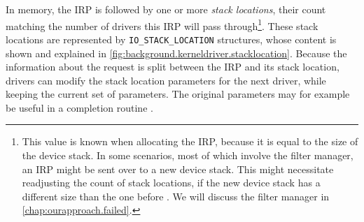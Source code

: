 In memory, the IRP is followed by one or more \emph{stack locations}, their count matching the number of drivers this IRP will pass through\footnote{\label{fn:background.kerneldriver.adjuststacksize} This value is known when allocating the IRP, because it is equal to the size of the device stack. In some scenarios, most of which involve the filter manager, an IRP might be sent over to a new device stack. This might necessitate readjusting the count of stack locations, if the new device stack has a different size than the one before \cite{Yosifovich2017}. We will discuss the filter manager in \autoref{chap:ourapproach.failed}.}. These stack locations are represented by \texttt{IO\_STACK\_LOCATION} structures, whose content is shown and explained in \autoref{fig:background.kerneldriver.stacklocation}. Because the information about the request is split between the IRP and its stack location, drivers can modify the stack location parameters for the next driver, while keeping the current set of parameters. The original parameters may for example be useful in a completion routine \cite{Yosifovich2017}.

